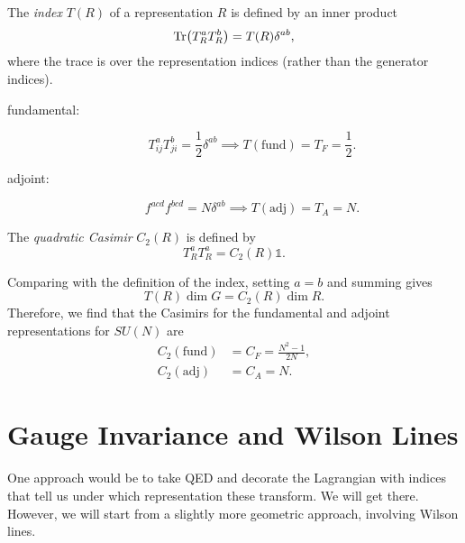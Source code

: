 \begin{definition}[index]
  The \emph{index} $T(R)$ of a representation $R$ is defined by an inner product
  \begin{equation}
    \Tr(T^{a}_R T^{b}_R) = T(R) \delta^{ab},
  \end{equation}
  where the trace is over the representation indices (rather than the generator indices).
\end{definition}
\begin{description}
  \item[fundamental:] 
  \begin{equation}
    \label{eq:t-f}
    T^{a}_{ij} T^{b}_{ji} = \frac{1}{2} \delta^{ab} \implies T(\text{fund}) = T_F = \frac{1}{2}.
  \end{equation}
\item[adjoint:] 
  \begin{equation}
    f^{acd} f^{bcd} = N \delta^{ab} \implies T(\text{adj}) = T_A = N.
  \end{equation}
\end{description}

\begin{definition}
  The \emph{quadratic Casimir} $C_2(R)$ is defined by
  \begin{equation}
    T^{a}_R T^{a}_R = C_2(R) \mathbb{1}.
  \end{equation}
\end{definition}
Comparing with the definition of the index, setting $a = b$ and summing gives
\begin{equation}
  T(R) \dim G = C_2 (R) \dim R.
\end{equation}
Therefore, we find that the Casimirs for the fundamental and adjoint representations for $SU(N)$ are
\begin{align}
  C_2 (\text{fund}) &= C_F = \frac{N^2 - 1}{2N}, \\
  C_2 (\text{adj}) &= C_A = N.
\end{align}

\section{Gauge Invariance and Wilson Lines}%
\label{sec:gauge_invariance_and_wilson_lines}

One approach would be to take QED and decorate the Lagrangian with indices that tell us under which representation these transform.
We will get there. However, we will start from a slightly more geometric approach, involving Wilson lines.


